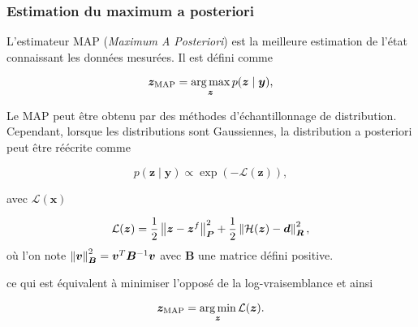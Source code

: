 \subsubsection{Estimation du maximum a posteriori}

L'estimateur MAP (\textit{Maximum A Posteriori}) est la meilleure estimation de l'état connaissant les données mesurées. Il est défini comme

\begin{equation*}
    \bm z_{\text{MAP}} = \operatorname*{arg\,max}_{\bm z} p(\bm z \mid \bm y),
\end{equation*}

Le MAP peut être obtenu par des méthodes d'échantillonnage de distribution. Cependant, lorsque les distributions sont Gaussiennes, la distribution a posteriori peut être réécrite comme



\begin{equation*}
    p(\bm z \mid \bm y) \propto \exp\left(- \mathcal{L}(\bm z)\right),
\end{equation*}

avec $\mathcal L(\bm x)$

\begin{equation*}
    \mathcal L(\bm z) = \frac12 \left\lVert \bm z - \bm z^f \right\rVert^2_{ \bm{P}} + \frac12 \left\lVert \mathcal H(\bm z) - \bm d \right\rVert^2_{\bm{R}},
\end{equation*}où l'on note $\left\lVert \bm v \right\rVert^2_{\bm B} = \bm v^T \bm B^{-1} \bm v$ avec $\bm B$ une matrice défini positive.

ce qui est équivalent à minimiser l'opposé de la log-vraisemblance et ainsi

\begin{equation*}
    \bm z_{\text{MAP}} = \operatorname*{arg\,min}_{\bm z} \mathcal L(\bm z).
\end{equation*}

